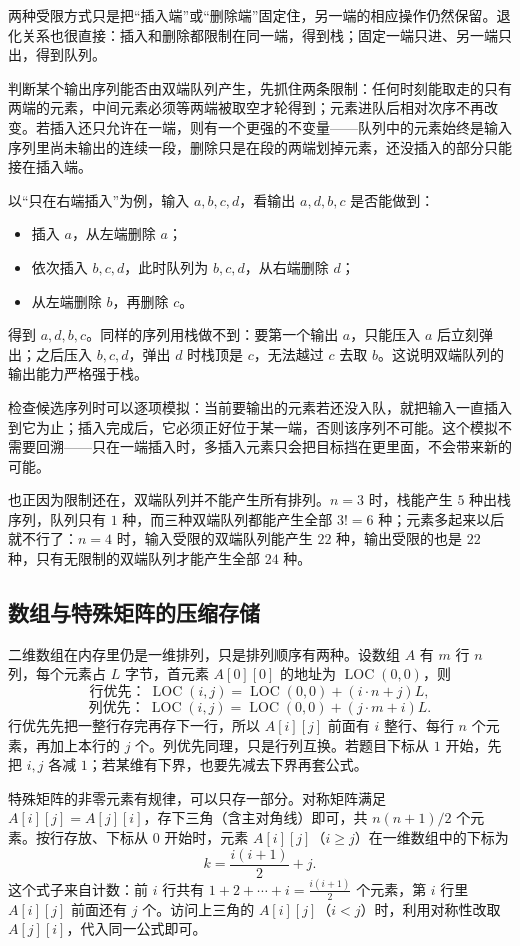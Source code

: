 两种受限方式只是把“插入端”或“删除端”固定住，另一端的相应操作仍然保留。退化关系也很直接：插入和删除都限制在同一端，得到栈；固定一端只进、另一端只出，得到队列。

判断某个输出序列能否由双端队列产生，先抓住两条限制：任何时刻能取走的只有两端的元素，中间元素必须等两端被取空才轮得到；元素进队后相对次序不再改变。若插入还只允许在一端，则有一个更强的不变量——队列中的元素始终是输入序列里尚未输出的连续一段，删除只是在段的两端划掉元素，还没插入的部分只能接在插入端。

以“只在右端插入”为例，输入 $a,b,c,d$，看输出 $a,d,b,c$ 是否能做到：
\begin{itemize}
    \item 插入 $a$，从左端删除 $a$；
    \item 依次插入 $b,c,d$，此时队列为 $b,c,d$，从右端删除 $d$；
    \item 从左端删除 $b$，再删除 $c$。
\end{itemize}
得到 $a,d,b,c$。同样的序列用栈做不到：要第一个输出 $a$，只能压入 $a$ 后立刻弹出；之后压入 $b,c,d$，弹出 $d$ 时栈顶是 $c$，无法越过 $c$ 去取 $b$。这说明双端队列的输出能力严格强于栈。

检查候选序列时可以逐项模拟：当前要输出的元素若还没入队，就把输入一直插入到它为止；插入完成后，它必须正好位于某一端，否则该序列不可能。这个模拟不需要回溯——只在一端插入时，多插入元素只会把目标挡在更里面，不会带来新的可能。

也正因为限制还在，双端队列并不能产生所有排列。$n=3$ 时，栈能产生 $5$ 种出栈序列，队列只有 $1$ 种，而三种双端队列都能产生全部 $3!=6$ 种；元素多起来以后就不行了：$n=4$ 时，输入受限的双端队列能产生 $22$ 种，输出受限的也是 $22$ 种，只有无限制的双端队列才能产生全部 $24$ 种。

\subsection{数组与特殊矩阵的压缩存储}

二维数组在内存里仍是一维排列，只是排列顺序有两种。设数组 $A$ 有 $m$ 行 $n$ 列，每个元素占 $L$ 字节，首元素 $A[0][0]$ 的地址为 $\operatorname{LOC}(0,0)$，则
\[
\text{行优先：}\ \operatorname{LOC}(i,j)=\operatorname{LOC}(0,0)+(i\cdot n+j)L,
\]
\[
\text{列优先：}\ \operatorname{LOC}(i,j)=\operatorname{LOC}(0,0)+(j\cdot m+i)L.
\]
行优先先把一整行存完再存下一行，所以 $A[i][j]$ 前面有 $i$ 整行、每行 $n$ 个元素，再加上本行的 $j$ 个。列优先同理，只是行列互换。若题目下标从 $1$ 开始，先把 $i,j$ 各减 $1$；若某维有下界，也要先减去下界再套公式。

特殊矩阵的非零元素有规律，可以只存一部分。对称矩阵满足 $A[i][j]=A[j][i]$，存下三角（含主对角线）即可，共 $n(n+1)/2$ 个元素。按行存放、下标从 $0$ 开始时，元素 $A[i][j]$（$i\geqslant j$）在一维数组中的下标为
\[
k=\frac{i(i+1)}{2}+j .
\]
这个式子来自计数：前 $i$ 行共有 $1+2+\cdots+i=\frac{i(i+1)}{2}$ 个元素，第 $i$ 行里 $A[i][j]$ 前面还有 $j$ 个。访问上三角的 $A[i][j]$（$i<j$）时，利用对称性改取 $A[j][i]$，代入同一公式即可。

